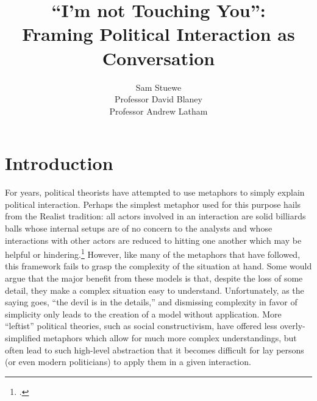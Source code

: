 \documentclass{article}
\begin{document}
\title{``I'm not Touching You'':\\ Framing Political Interaction as Conversation}
\author{Sam Stuewe\\ Professor David Blaney 
   \\ Professor Andrew Latham}
\maketitle
\thispagestyle{empty}
\newpage
\tableofcontents
\thispagestyle{empty}
\newpage
\setcounter{page}{1}
\section{Introduction}
For years, political theorists have attempted to use metaphors to simply explain political interaction. 
Perhaps the simplest metaphor used for this purpose hails from the Realist tradition: all actors involved in an interaction are solid billiards balls whose internal setups are of no concern to the analysts and whose interactions with other actors are reduced to hitting one another which may be helpful or hindering.\footcite{mearsheimer01} 
However, like many of the metaphors that have followed, this framework fails to grasp the complexity of the situation at hand. 
Some would argue that the major benefit from these models is that, despite the loss of some detail, they make a complex situation easy to understand. 
Unfortunately, as the saying goes, ``the devil is in the details,'' and dismissing complexity in favor of simplicity only leads to the creation of a model without application. 
More ``leftist'' political theories, such as social constructivism, have offered less overly-simplified metaphors which allow for much more complex understandings, but often lead to such high-level abstraction that it becomes difficult for lay persons (or even modern politicians) to apply them in a given interaction.
\end{document}
